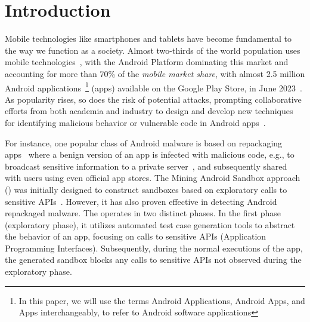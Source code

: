\section{Introduction}\label{sec:introduction}

Mobile technologies like smartphones and tablets have become fundamental to the way we function as a society. Almost two-thirds of the world population
uses mobile technologies~\cite{Comscore,DBLP:journals/tse/MartinSJZH17}, with the
Android Platform dominating this market and accounting for more than 70\% of the \emph{mobile
market share}, with almost 2.5 million Android applications~\footnote{In this paper, we will use the terms Android Applications, Android Apps, and Apps interchangeably, to refer to Android software applications} (apps)
available on the Google Play Store, in June 2023~\cite{Statista}.  
As popularity rises, so does the risk of potential attacks, prompting collaborative efforts from both academia and industry to design and develop new techniques for identifying malicious behavior or vulnerable code in Android apps~\cite{10.1145/3017427}.

For instance, one popular class of Android malware is based on repackaging apps~\cite{DBLP:conf/wcre/BaoLL18,le2018towards} where a benign
version of an app is
infected with malicious code, e.g., to broadcast
sensitive information to a private server~\cite{DBLP:journals/tse/LiBK21}, and subsequently shared
with users using even official app stores. The Mining Android Sandbox approach (\mas) was initially designed to construct sandboxes based on exploratory calls to sensitive APIs~\cite{DBLP:conf/icse/JamrozikSZ16}. However, it has also proven effective in detecting Android repackaged malware. The \mas operates in two distinct phases. In the first phase (exploratory phase), it utilizes automated test case generation tools to abstract the behavior of an app, focusing on calls to sensitive APIs (Application Programming Interfaces). Subsequently, during the normal executions of the app, the generated sandbox blocks any calls to sensitive APIs not observed during the exploratory phase.

